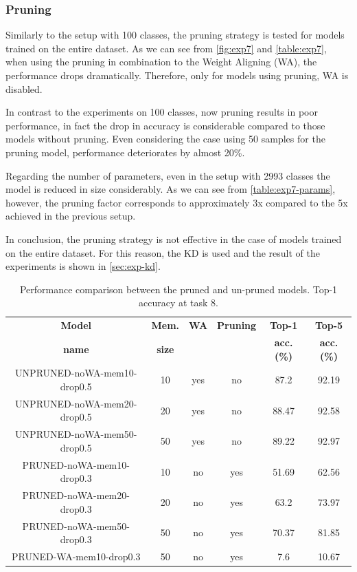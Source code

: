 \subsubsection{Pruning}
\label{sec:pruning-entire}
Similarly to the setup with 100 classes, the pruning strategy is tested for models trained on the entire dataset. As we can see from \autoref{fig:exp7} and \autoref{table:exp7}, when using the pruning in combination to the Weight Aligning (WA), the performance drops dramatically. Therefore, only for models using pruning, WA is disabled.

In contrast to the experiments on 100 classes, now pruning results in poor performance, in fact the drop in accuracy is considerable compared to those models without pruning. Even considering the case using 50 samples for the pruning model, performance deteriorates by almost 20\%.

Regarding the number of parameters, even in the setup with 2993 classes the model is reduced in size considerably. As we can see from \autoref{table:exp7-params}, however, the pruning factor corresponds to approximately 3x compared to the 5x achieved in the previous setup.

In conclusion, the pruning strategy is not effective in the case of models trained on the entire dataset. For this reason, the KD is used and the result of the experiments is shown in \autoref{sec:exp-kd}.

\begin{table}[H]
    \centering
    \begin{tabular}{c|c|c|c|c|c}
        \hline
        \textbf{Model} &
        \textbf{Mem.} &
        \textbf{WA} &
        \textbf{Pruning} &
        \textbf{Top-1} & 
        \textbf{Top-5} \\
        \textbf{name} &
        \textbf{size} &
        &
        &
        \textbf{acc. (\%)} & 
        \textbf{acc. (\%)} \\
        \hline
        \hline
UNPRUNED-noWA-mem10-drop0.5&10&yes&no&87.2&92.19\\
UNPRUNED-noWA-mem20-drop0.5&20&yes&no&88.47&92.58\\
UNPRUNED-noWA-mem50-drop0.5&50&yes&no&89.22&92.97\\
\hline
PRUNED-noWA-mem10-drop0.3&10&no&yes&51.69&62.56\\
PRUNED-noWA-mem20-drop0.3&20&no&yes&63.2&73.97\\
PRUNED-noWA-mem50-drop0.3&50&no&yes&70.37&81.85\\
\hline
PRUNED-WA-mem10-drop0.3&50&no&yes&7.6&10.67\\
\hline
\end{tabular}
\caption{Performance comparison between the pruned and un-pruned models. Top-1 accuracy at task 8.}
    \label{table:exp7}
\end{table}


